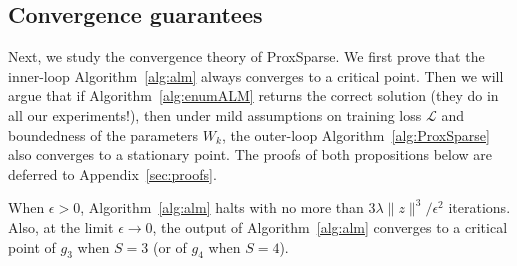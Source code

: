 \begin{table}[!t]
    \centering
    \caption{Comparison of the runtime and accuracy of solvers of \eqref{eq:prox} for solving 100 randomly generated problem instances, each with 200 different choices of $\lambda$. The second row shows the worst-case suboptimality. IPM is guaranteed to give the optimal solution up-to a tolerance parameter of $10^{-13}$. ALM achieves better objective value in all experiments than IPM, while GD occasionally gives solutions with slightly suboptimal objective values.}
    \label{tab:computation}
\end{table}



\subsection{Convergence guarantees}


Next, we study the convergence theory of ProxSparse. We first prove that the inner-loop Algorithm~\ref{alg:alm} always converges to a critical point. Then we will argue that if Algorithm~\ref{alg:enumALM} returns the correct solution (they do in all our experiments!), then under mild assumptions on training loss $\mathcal{L}$ and boundedness of the parameters $W_k$, the outer-loop Algorithm~\ref{alg:ProxSparse} also converges to a stationary point. The proofs of both propositions below are deferred to Appendix~\ref{sec:proofs}.


\begin{proposition}\label{prop:innerloop_convergence}
When $\epsilon>0$, Algorithm~\ref{alg:alm} halts with no more than $3\lambda \|z\|^3/\epsilon^2$ iterations. Also, at the limit $\epsilon\rightarrow 0$, the output of Algorithm~\ref{alg:alm} converges to a critical point of $g_3$ when $S=3$ (or of $g_4$ when $S=4$).
\end{proposition}



